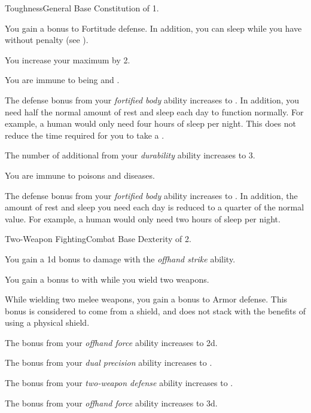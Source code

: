     \begin{feat}{Toughness}{General}
        \featpre Base Constitution of 1.

         You gain a  bonus to Fortitude defense.
        In addition, you can sleep while you have  without penalty (see ).

         You increase your maximum  by 2.

         You are immune to being  and .

         The defense bonus from your \textit{fortified body} ability increases to .
        In addition, you need half the normal amount of rest and sleep each day to function normally.
        For example, a human would only need four hours of sleep per night.
        This does not reduce the time required for you to take a .

         The number of additional  from your \textit{durability} ability increases to 3.

         You are immune to poisons and diseases.

         The defense bonus from your \textit{fortified body} ability increases to .
        In addition, the amount of rest and sleep you need each day is reduced to a quarter of the normal value.
        For example, a human would only need two hours of sleep per night.
    \end{feat}

    \begin{feat}{Two-Weapon Fighting}{Combat}
        \featpre Base Dexterity of 2.

         You gain a \plus1d bonus to damage with the \textit{offhand strike} ability.

         You gain a  bonus to  with  while you wield two weapons.

         While wielding two melee weapons, you gain a  bonus to Armor defense.
        This bonus is considered to come from a shield, and does not stack with the benefits of using a physical shield.

         The bonus from your \textit{offhand force} ability increases to \plus2d.

         The bonus from your \textit{dual precision} ability increases to .

         The bonus from your \textit{two-weapon defense} ability increases to .

         The bonus from your \textit{offhand force} ability increases to \plus3d.
    \end{feat}

